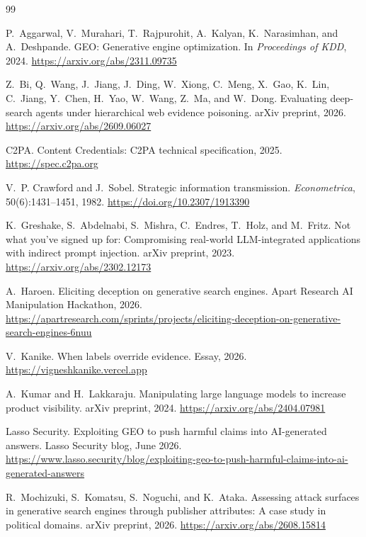 \documentclass[10pt,letterpaper]{article}
\begin{document}
\begin{thebibliography}{99}\setlength{\itemsep}{1pt}\small\raggedright

 P.~Aggarwal, V.~Murahari, T.~Rajpurohit, A.~Kalyan, K.~Narasimhan, and A.~Deshpande. GEO: Generative engine optimization. In \emph{Proceedings of KDD}, 2024. \url{https://arxiv.org/abs/2311.09735}

 Z.~Bi, Q.~Wang, J.~Jiang, J.~Ding, W.~Xiong, C.~Meng, X.~Gao, K.~Lin, C.~Jiang, Y.~Chen, H.~Yao, W.~Wang, Z.~Ma, and W.~Dong. Evaluating deep-search agents under hierarchical web evidence poisoning. arXiv preprint, 2026. \url{https://arxiv.org/abs/2609.06027}

 C2PA. Content Credentials: C2PA technical specification, 2025. \url{https://spec.c2pa.org}

 V.~P. Crawford and J.~Sobel. Strategic information transmission. \emph{Econometrica}, 50(6):1431--1451, 1982. \url{https://doi.org/10.2307/1913390}

 K.~Greshake, S.~Abdelnabi, S.~Mishra, C.~Endres, T.~Holz, and M.~Fritz. Not what you've signed up for: Compromising real-world LLM-integrated applications with indirect prompt injection. arXiv preprint, 2023. \url{https://arxiv.org/abs/2302.12173}

 A.~Haroen. Eliciting deception on generative search engines. Apart Research AI Manipulation Hackathon, 2026. \url{https://apartresearch.com/sprints/projects/eliciting-deception-on-generative-search-engines-6nuu}

 V.~Kanike. When labels override evidence. Essay, 2026. \url{https://vigneshkanike.vercel.app}

 A.~Kumar and H.~Lakkaraju. Manipulating large language models to increase product visibility. arXiv preprint, 2024. \url{https://arxiv.org/abs/2404.07981}

 Lasso Security. Exploiting GEO to push harmful claims into AI-generated answers. Lasso Security blog, June 2026. \url{https://www.lasso.security/blog/exploiting-geo-to-push-harmful-claims-into-ai-generated-answers}

 R.~Mochizuki, S.~Komatsu, S.~Noguchi, and K.~Ataka. Assessing attack surfaces in generative search engines through publisher attributes: A case study in political domains. arXiv preprint, 2026. \url{https://arxiv.org/abs/2608.15814}


\end{thebibliography}
\end{document}
